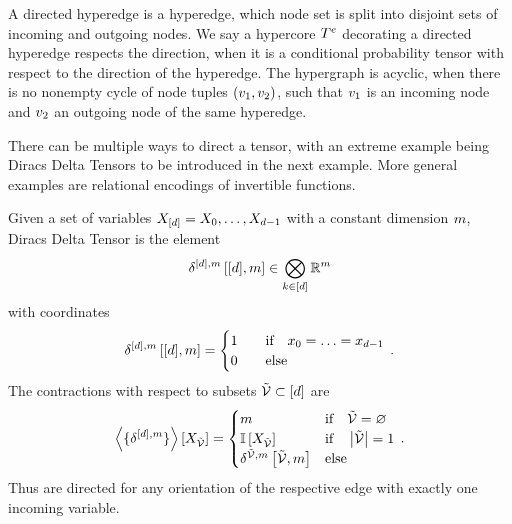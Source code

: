 \begin{definition}
    A directed hyperedge is a hyperedge, which node set is split into disjoint sets of incoming and outgoing nodes.
    We say a hypercore $T^{e}$ decorating a directed hyperedge respects the direction, when it is a conditional probability tensor with respect to the direction of the hyperedge.
    The hypergraph is acyclic, when there is no nonempty cycle of node tuples $(v_1,v_2)$, such that $v_1$ is an incoming node and $v_2$ an outgoing node of the same hyperedge.
\end{definition}

There can be multiple ways to direct a tensor, with an extreme example being Diracs Delta Tensors to be introduced in the next example.
More general examples are relational encodings of invertible functions.

\begin{example}
    Given a set of variables $X_{[d]}=X_{0},\ldots,X_{d-1}$ with a constant dimension $m$, Diracs Delta Tensor is the element
    \begin{align*}
        \delta^{[d],m}\left[[d],m\right] \in \bigotimes_{k\in[d]} \mathbb{R}^{m}
    \end{align*}
    with coordinates
    \begin{align}
        \delta^{[d],m}\left[[d],m\right] =
        \begin{cases}
            1 \quad & \text{if} \quad x_{0} = \ldots = x_{d-1} \\
            0 & \text{else}
        \end{cases} \, .
    \end{align}
    The contractions with respect to subsets $\tilde{\mathcal{V}}\subset[d]$ are
    \begin{align}
        \left\langle \{\delta^{[d],m}\}\right\rangle \left[ X_{\tilde{\mathcal{V}}} \right] =
        \begin{cases}
            m & \text{if} \quad \tilde{\mathcal{V}} = \varnothing \\
            \mathbb{I}\left[X_{\tilde{\mathcal{V}}}\right] & \text{if} \quad \left|\tilde{\mathcal{V}}\right| = 1\\
            \delta^{\tilde{\mathcal{V}},m}\left[\tilde{\mathcal{V}},m\right] & \text{else}
        \end{cases} \, .
    \end{align}
    Thus are directed for any orientation of the respective edge with exactly one incoming variable.
\end{example}

